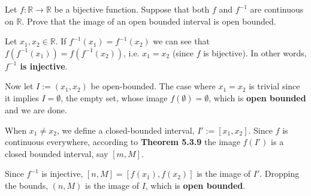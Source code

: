\documentclass[boxes, qed]{homework}
\begin{document}
\begin{problem}Let $f:\mathbb{R}\to\mathbb{R}$ be a bijective function. 
  Suppose that both $f$ and $f^{-1}$ are continuous on $\mathbb{R}$. 
  Prove that the image of an open bounded interval is open bounded.
\end{problem}
\begin{solution}Let $x_1,x_2\in{\mathbb{R}}$. If $f^{-1}(x_1)=f^{-1}(x_2)$
  we can see that $f(f^{-1}(x_1))=f(f^{-1}(x_2))$, i.e. $x_1=x_2$ (since 
  $f$ is bijective). In other words, \textbf{$f^{-1}$ is injective}.

  Now let $I:=(x_1,x_2)$ be open-bounded. The case where $x_1=x_2$ is trivial
  since it implies $I=\emptyset$, the empty set, whose image
  $f(\emptyset)=\emptyset$, which is \textbf{open bounded} and
  we are done.

  When $x_1\ne{x_2}$, we define a closed-bounded interval, $I':=[x_1,x_2]$.
  Since $f$ is continuous everywhere, according to \textbf{Theorem 5.3.9}
  the image $f(I')$ is a closed bounded interval, say $[m,M]$.

  Since $f^{-1}$ is injective, $[n,M]=[f(x_1),f(x_2)]$ 
  is the image of $I'$. Dropping the bounds,
  $(n,M)$ is the image of $I$, which is \textbf{open bounded}.
\end{solution}
\end{document}
